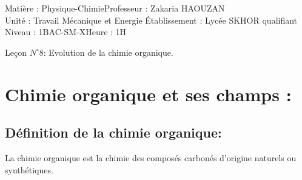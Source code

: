 \documentclass[12pt]{article}
\author{Zakaria HAOUZAN}
\date{\today}
\newcommand\headerMe[2]{\noindent{}#1\hfill#2}
\begin{document}
\headerMe{Matière : Physique-Chimie}{Professeur : Zakaria HAOUZAN}\\
\headerMe{Unité : Travail Mécanique et Energie }{Établissement : Lycée SKHOR qualifiant}\\
\headerMe{Niveau : 1BAC-SM-X}{Heure : 1H}\\

\begin{center}

  \Large{Leçon $N^{\circ} 8 $: \color{red}Evolution  de la chimie organique. }
\end{center}







\section{Chimie organique et ses champs :}
  \subsection{ Définition de la chimie organique: }
  La chimie organique est la chimie des composés carbonés d'origine naturels ou synthétiques.
\end{document}
